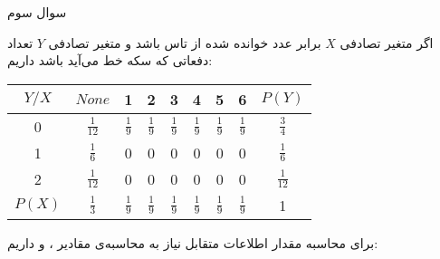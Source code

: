 \Problem
{سوال سوم}
{
اگر متغیر تصادفی $X$ برابر عدد خوانده شده از تاس باشد و متغیر تصادفی $Y$ تعداد دفعاتی که سکه خط می‌آید باشد داریم:  

\begin{latin}
\begin{center}
  \renewcommand{\arraystretch}{1.6}
  \begin{tabular}{| c | c | c | c | c | c | c | c | c |}
    \hline
    $Y/X$ & $None$ & 1 & 2 & 3 & 4 & 5 & 6 & $P(Y)$ \\ \hline
    0 & $\frac{1}{12}$ & $\frac{1}{9}$ & $\frac{1}{9}$ & $\frac{1}{9}$ & $\frac{1}{9}$ & $\frac{1}{9}$ & $\frac{1}{9}$ & $\frac{3}{4}$ \\ \hline
    1 & $\frac{1}{6}$ & 0 & 0 & 0 & 0 & 0 & 0 & $\frac{1}{6}$ \\ \hline
    2 & $\frac{1}{12}$ & 0 & 0 & 0 & 0 & 0 & 0 & $\frac{1}{12}$ \\ \hline
    $P(X)$ & $\frac{1}{3}$ & $\frac{1}{9}$ & $\frac{1}{9}$ & $\frac{1}{9}$ & $\frac{1}{9}$ & $\frac{1}{9}$ & $\frac{1}{9}$ & 1 \\
    \hline
  \end{tabular}
\end{center}
\end{latin}


برای محاسبه مقدار اطلاعات متقابل 
نیاز به محاسبه‌ی مقادیر 
، 
 و 
داریم:


}
